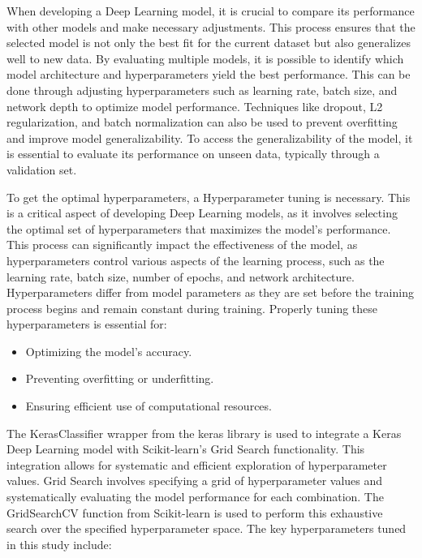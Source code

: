 When developing a Deep Learning model, it is crucial to compare its performance with other models and make necessary adjustments. This process ensures that the selected model is not only the best fit for the current dataset but also generalizes well to new data. By evaluating multiple models, it is possible to identify which model architecture and hyperparameters yield the best performance. This can be done through adjusting hyperparameters such as learning rate, batch size, and network depth to optimize model performance. Techniques like dropout, L2 regularization, and batch normalization can also be used to prevent overfitting and improve model generalizability. To access the generalizability of the model, it is essential to evaluate its performance on unseen data, typically through a validation set.

To get the optimal hyperparameters, a Hyperparameter tuning is necessary. This is a critical aspect of developing Deep Learning models, as it involves selecting the optimal set of hyperparameters that maximizes the model's performance. This process can significantly impact the effectiveness of the model, as hyperparameters control various aspects of the learning process, such as the learning rate, batch size, number of epochs, and network architecture. Hyperparameters differ from model parameters as they are set before the training process begins and remain constant during training. Properly tuning these hyperparameters is essential for: \autocite{hutterAutomatedMachineLearning2019}

\begin{itemize}
    \item Optimizing the model's accuracy.
    \item Preventing overfitting or underfitting.
    \item Ensuring efficient use of computational resources.
\end{itemize}

The KerasClassifier wrapper from the keras library is used to integrate a Keras Deep Learning model with Scikit-learn's Grid Search functionality. This integration allows for systematic and efficient exploration of hyperparameter values. Grid Search involves specifying a grid of hyperparameter values and systematically evaluating the model performance for each combination. The GridSearchCV function from Scikit-learn is used to perform this exhaustive search over the specified hyperparameter space. The key hyperparameters tuned in this study include:

